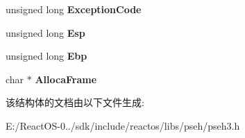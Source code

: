 \begin{DoxyCompactItemize}
\mbox{\label{struct_0B___r_e_g_i_s_t_r_a_t_i_o_n___f_r_a_m_e_ab925816e79a6aec4ce1984cffff4283e}} 
unsigned long {\bfseries Exception\+Code}
\item 
\mbox{\label{struct_0B___r_e_g_i_s_t_r_a_t_i_o_n___f_r_a_m_e_a4c28aad3b8596274c33b1ba54a25c74a}} 
unsigned long {\bfseries Esp}
\item 
\mbox{\label{struct_0B___r_e_g_i_s_t_r_a_t_i_o_n___f_r_a_m_e_a8f90817fe1b1628a700508177439b680}} 
unsigned long {\bfseries Ebp}
\item 
\mbox{\label{struct_0B___r_e_g_i_s_t_r_a_t_i_o_n___f_r_a_m_e_ad25d5f3519a7a4250581da3aa96fb365}} 
char $\ast$ {\bfseries Alloca\+Frame}
\end{DoxyCompactItemize}


该结构体的文档由以下文件生成\+:\begin{DoxyCompactItemize}
\item 
E\+:/\+React\+O\+S-\/0../sdk/include/reactos/libs/pseh/pseh3.\+h\end{DoxyCompactItemize}
